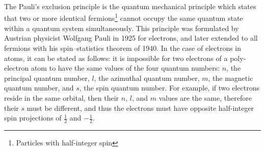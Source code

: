 \begin{chembox}{}
{The Pauli's exclusion principle is the quantum mechanical principle which states that two or more identical fermions\footnote{Particles with half-integer spin} cannot occupy the same quantum state within a quantum system simultaneously. This principle was formulated by Austrian physicist Wolfgang Pauli in 1925 for electrons, and later extended to all fermions with his spin–statistics theorem of 1940.
In the case of electrons in atoms, it can be stated as follows: it is impossible for two electrons of a poly-electron atom to have the same values of the four quantum numbers: $n$, the principal quantum number, $l$, the azimuthal quantum number, $m$, the magnetic quantum number, and $s$, the spin quantum number. For example, if two electrons reside in the same orbital, then their $n$, $l$, and $m$ values are the same, therefore their $s$ must be different, and thus the electrons must have opposite half-integer spin projections of $\frac{1}{2}$ and $-\frac{1}{2}$.}
\end{chembox}
